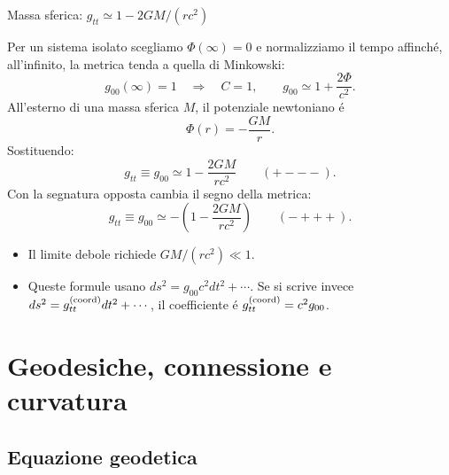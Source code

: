 \begin{frame}[t]{Massa sferica: $g_{tt}\simeq1-2GM/(rc^2)$}
\small\raggedright
Per un sistema isolato scegliamo $\Phi(\infty)=0$ e normalizziamo il tempo
affinch\'e, all'infinito, la metrica tenda a quella di Minkowski:
\[
g_{00}(\infty)=1\quad\Longrightarrow\quad C=1,
\qquad
\boxed{g_{00}\simeq1+\frac{2\Phi}{c^2}.}
\]
All'esterno di una massa sferica $M$, il potenziale newtoniano \'e
\[
\Phi(r)=-\frac{GM}{r}.
\]
Sostituendo:
\[
\boxed{g_{tt}\equiv g_{00}\simeq1-\frac{2GM}{rc^2}
\qquad(+---).}
\]
Con la segnatura opposta cambia il segno della metrica:
\[
\boxed{g_{tt}\equiv g_{00}\simeq-\left(1-\frac{2GM}{rc^2}\right)
\qquad(-+++).}
\]
\begin{itemize}
  \item Il limite debole richiede $GM/(rc^2)\ll1$.
  \item Queste formule usano $ds^2=g_{00}c^2dt^2+\cdots$.
  Se si scrive invece $ds^2=g_{tt}^{\rm(coord)}dt^2+\cdots$,
  il coefficiente \'e $g_{tt}^{\rm(coord)}=c^2g_{00}$.
\end{itemize}
\end{frame}

\section{Geodesiche, connessione e curvatura}

\subsection{Equazione geodetica}

